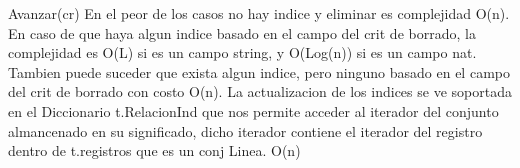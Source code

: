 {			\EndIf
			\State Avanzar(cr)													
		\EndWhile
	\EndIf
	\State En el peor de los casos no hay indice y eliminar es complejidad O(n).
	\State En caso de que haya algun indice basado en el campo del crit de borrado,
	\State la complejidad es O(L) si es un campo string, y O(Log(n)) si es un campo nat.
	\State Tambien puede suceder que exista algun indice, pero ninguno basado en el campo
	\State del crit de borrado con costo O(n).
	\State La actualizacion de los indices se ve soportada en el Diccionario t.RelacionInd
	\State que nos permite acceder al iterador del conjunto almancenado en su significado,
	\State dicho iterador contiene el iterador del registro dentro de t.registros que es un conj Linea.
}{O(n)}
%	
%	
%
